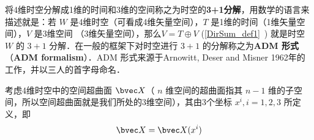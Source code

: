 
将4维时空分解成1维的时间和3维的空间称之为时空的\textbf{3+1分解}，用数学的语言来描述就是：若 $W$ 是4维时空（可看成4维矢量空间），$T$ 是1维的时间（1维矢量空间），$V$ 是3维空间 （3维矢量空间），那么$V=T\oplus V$ (\autoref{DirSum_def1}~) 就是时空 $W$ 的 $3+1$ 分解．在一般的框架下对时空进行 $3+1$ 的分解称之为\textbf{ADM 形式}（\textbf{ADM formalism}）．ADM 形式来源于Arnowitt, Deser and Misner 1962年的工作，并以三人的首字母命名．

考虑4维时空中的空间超曲面 $\bvec X$（ $n$ 维空间的超曲面指其 $n-1$ 维的子空间，所以空间超曲面就是我们所处的3维空间），其由3个坐标 $x^i,i=1,2,3$ 所定义，即 
\begin{equation}
\bvec X=\bvec X(x^i)
\end{equation}